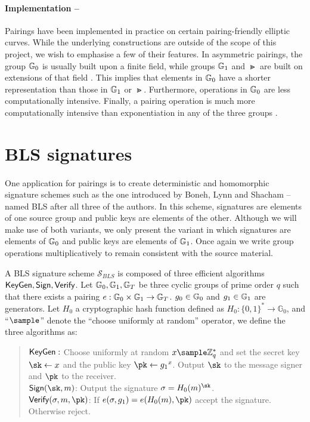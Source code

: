 \paragraph{Implementation --} Pairings have been implemented in practice on certain pairing-friendly elliptic curves. While the underlying constructions are outside of the scope of this project, we wish to emphasise a few of their features. In asymmetric pairings, the group $\mathbb{G}_0$ is usually built upon a finite field, while groups $\mathbb{G}_1$ and $\Gt$ are built on extensions of that field \cite{BonehShoup}. This implies that elements in $\mathbb{G}_0$ have a shorter representation than those in $\mathbb{G}_1$ or $\Gt$. Furthermore, operations in $\mathbb{G}_0$ are less computationally intensive. Finally, a pairing operation is much more computationally intensive than exponentiation in any of the three groups \cite{BonehShoup}.

\section{BLS signatures}

\paragraph{} One application for pairings is to create deterministic and homomorphic signature schemes such as the one introduced by Boneh, Lynn and Shacham \cite{BLS} -- named BLS after all three of the authors. In this scheme, signatures are elements of one source group and public keys are elements of the other. Although we will make use of both variants, we only present the variant in which signatures are elements of $\mathbb{G}_0$ and public keys are elements of $\mathbb{G}_1$. Once again we write group operations multiplicatively to remain consistent with the source material.


\begin{definition}
	A BLS signature scheme $\mathcal{S}_{BLS}$ is composed of three efficient algorithms $\mathsf{KeyGen}, \mathsf{Sign}, \mathsf{Verify}$. Let $\mathbb{G}_0, \mathbb{G}_1, \mathbb{G}_T$ be three cyclic groups of prime order $q$ such that there exists a pairing $e : \mathbb{G}_0 \times \mathbb{G}_1 \rightarrow \mathbb{G}_T$. $g_0 \in \mathbb{G}_0$ and $g_1 \in \mathbb{G}_1$ are generators. Let $H_0$ a cryptographic hash function defined as $H_0: \{0,1\}^* \rightarrow \mathbb{G}_0$, and ``$\sample$'' denote the ``choose uniformly at random'' operator, we define the three algorithms as:
	\begin{quote}
		$\mathsf{KeyGen}:$ Choose uniformly at random $x \sample \mathbb{Z}_q^* $ and set the secret key $\sk \leftarrow x$ and the public key $\pk \leftarrow {g_1}^x$. Output $\sk$ to the message signer and $\pk$ to the receiver. \\
		$\Sign(\sk, m)$: Output the signature $\sigma = H_0(m)^\sk$. \\
		$\Verif(\sigma, m, \pk)$: If $e(\sigma, g_1) = e(H_0(m), \pk)$ accept the signature. Otherwise reject.
	\end{quote}

\end{definition} 

